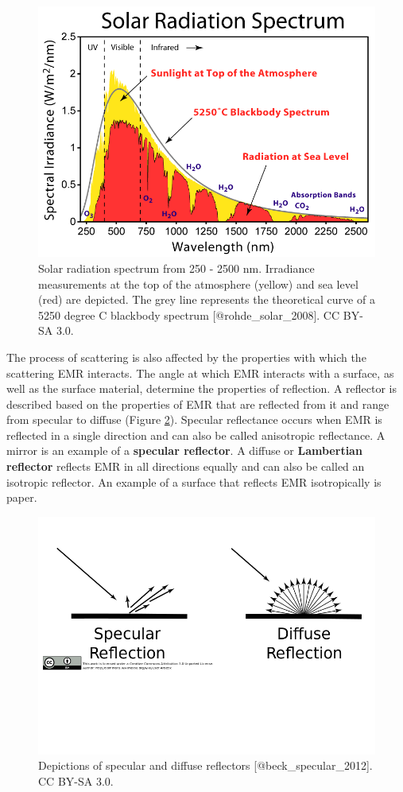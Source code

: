 \documentclass[
]{book}
\begin{document}
\begin{figure}
\includegraphics[width=11.11in]{images/11-solar-radiation} \caption{Solar radiation spectrum from 250 - 2500 nm. Irradiance measurements at the top of the atmosphere (yellow) and sea level (red) are depicted. The grey line represents the theoretical curve of a 5250 degree C blackbody spectrum [@rohde_solar_2008]. CC BY-SA 3.0.}\label{fig:11-solar-radiation}
\end{figure}

The process of scattering is also affected by the properties with which the scattering EMR interacts. The angle at which EMR interacts with a surface, as well as the surface material, determine the properties of reflection. A reflector is described based on the properties of EMR that are reflected from it and range from specular to diffuse (Figure \ref{fig:11-reflectors}). Specular reflectance occurs when EMR is reflected in a single direction and can also be called anisotropic reflectance. A mirror is an example of a \textbf{specular reflector}. A diffuse or \textbf{Lambertian reflector} reflects EMR in all directions equally and can also be called an isotropic reflector. An example of a surface that reflects EMR isotropically is paper.

\begin{figure}
\includegraphics[width=0.75\linewidth,height=0.75\textheight]{images/11-reflectors} \caption{Depictions of specular and diffuse reflectors [@beck_specular_2012]. CC BY-SA 3.0.}\label{fig:11-reflectors}
\end{figure}
\end{document}
